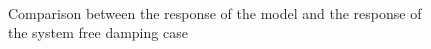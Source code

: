 \begin{figure}
	\ContinuedFloat
	\centering
		\\
	\caption{Comparison between the response of the model and the response of the 
	system free damping case}
	\label{fig:freedampingcase}
\end{figure}
%
\newpage
